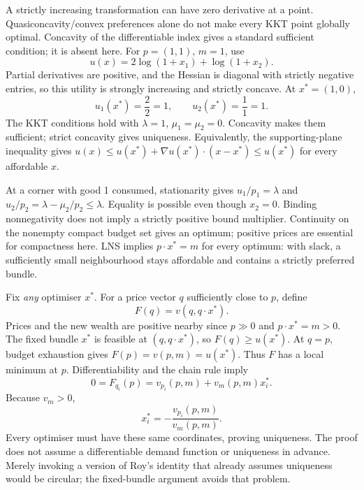 \documentclass[11pt,a4paper]{article}
\begin{document}
A strictly increasing transformation can have zero derivative at a point. Quasiconcavity/convex preferences alone do not make every KKT point globally optimal. Concavity of the differentiable index gives a standard sufficient condition; it is absent here.
For $p=(1,1)$, $m=1$, use
\[
 u(x)=2\log(1+x_1)+\log(1+x_2).
\]
Partial derivatives are positive, and the Hessian is diagonal with strictly negative entries, so this utility is strongly increasing and strictly concave. At $x^*=(1,0)$,
\[
 u_1(x^*)=\frac{2}{2}=1,\qquad u_2(x^*)=\frac{1}{1}=1.
\]
The KKT conditions hold with $\lambda=1$, $\mu_1=\mu_2=0$. Concavity makes them sufficient; strict concavity gives uniqueness. Equivalently, the supporting-plane inequality gives $u(x)\le u(x^*)+\nabla u(x^*)\cdot(x-x^*)\le u(x^*)$ for every affordable $x$.

At a corner with good 1 consumed, stationarity gives $u_1/p_1=\lambda$ and $u_2/p_2=\lambda-\mu_2/p_2\le\lambda$. Equality is possible even though $x_2=0$. Binding nonnegativity does not imply a strictly positive bound multiplier.
\clearpage
{}
Continuity on the nonempty compact budget set gives an optimum; positive prices are essential for compactness here. LNS implies $p\cdot x^*=m$ for every optimum: with slack, a sufficiently small neighbourhood stays affordable and contains a strictly preferred bundle.

Fix \emph{any} optimiser $x^*$. For a price vector $q$ sufficiently close to $p$, define
\[
 F(q)=v(q,q\cdot x^*).
\]
Prices and the new wealth are positive nearby since $p\gg0$ and $p\cdot x^*=m>0$. The fixed bundle $x^*$ is feasible at $(q,q\cdot x^*)$, so $F(q)\ge u(x^*)$. At $q=p$, budget exhaustion gives $F(p)=v(p,m)=u(x^*)$. Thus $F$ has a local minimum at $p$. Differentiability and the chain rule imply
\[
 0=F_{q_i}(p)=v_{p_i}(p,m)+v_m(p,m)x_i^*.
\]
Because $v_m>0$,
\[
 x_i^*=-\frac{v_{p_i}(p,m)}{v_m(p,m)}.
\]
Every optimiser must have these same coordinates, proving uniqueness. The proof does not assume a differentiable demand function or uniqueness in advance. Merely invoking a version of Roy's identity that already assumes uniqueness would be circular; the fixed-bundle argument avoids that problem.
\end{document}
